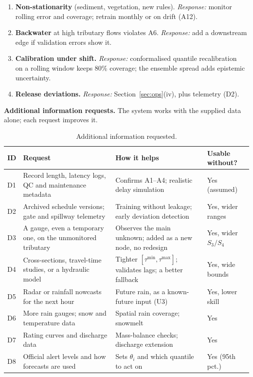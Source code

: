\documentclass[11pt,a4paper]{article}
\begin{document}
\begin{enumerate}[label=\textbf{U\arabic*}, ref=U\arabic*, leftmargin=*]
  \item \textbf{Non-stationarity} (sediment, vegetation, new rules).
  \emph{Response:} monitor rolling error and coverage; retrain monthly or on
  drift (A12).

  \item \textbf{Backwater} at high tributary flows violates A6.
  \emph{Response:} add a downstream edge if validation errors show it.

  \item \textbf{Calibration under shift.} \emph{Response:} conformalised
  quantile recalibration~\cite{cqr} on a rolling window keeps 80\% coverage;
  the ensemble spread adds epistemic uncertainty.

  \item \textbf{Release deviations.} \emph{Response:} Section~\ref{sec:ops}(iv),
  plus telemetry (D2).
\end{enumerate}

\noindent\textbf{Additional information requests.} The system works with the
supplied data alone; each request improves it.

\begin{table}[H]
\centering\small
\caption{Additional information requested.}
\label{tab:requests}
\begin{tabularx}{\textwidth}{@{}l L L l@{}}
\toprule
\textbf{ID} & \textbf{Request} & \textbf{How it helps} & \textbf{Usable without?} \\
\midrule
D1 & Record length, latency logs, QC and maintenance metadata & Confirms A1--A4; realistic delay simulation & Yes (assumed) \\
D2 & Archived schedule versions; gate and spillway telemetry & Training without leakage; early deviation detection & Yes, wider ranges \\
D3 & A gauge, even a temporary one, on the unmonitored tributary & Observes the main unknown; added as a new node, no redesign & Yes, wider $S_3/S_4$ \\
D4 & Cross-sections, travel-time studies, or a hydraulic model & Tighter $[\tau^{\min},\tau^{\max}]$; validates lags; a better fallback & Yes, wide bounds \\
D5 & Radar or rainfall nowcasts for the next hour & Future rain, as a known-future input (U3) & Yes, lower skill \\
D6 & More rain gauges; snow and temperature data & Spatial rain coverage; snowmelt & Yes \\
D7 & Rating curves and discharge data & Mass-balance checks; discharge extension & Yes \\
D8 & Official alert levels and how forecasts are used & Sets $\theta_i$ and which quantile to act on & Yes (95th pct.) \\
\bottomrule
\end{tabularx}
\end{table}
\end{document}
